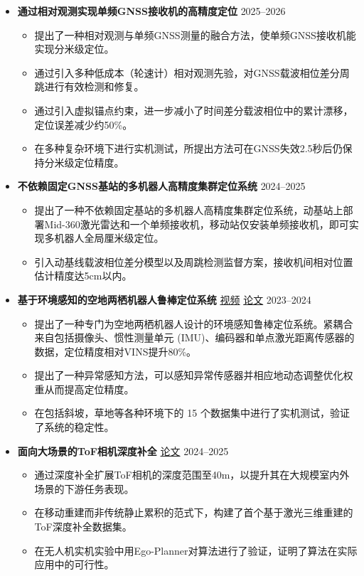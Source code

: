 \documentclass{resume}
\begin{document}
\begin{itemize}
	\item {\textbf{通过相对观测实现单频GNSS接收机的高精度定位}} \hfill {2025--2026}
	\begin{itemize}
		\item {提出了一种相对观测与单频GNSS测量的融合方法，使单频GNSS接收机能实现分米级定位。}
		\item {通过引入多种低成本（轮速计）相对观测先验，对GNSS载波相位差分周跳进行有效检测和修复。}
		\item {通过引入虚拟锚点约束，进一步减小了时间差分载波相位中的累计漂移，定位误差减少约50\%。}
		\item {在多种复杂环境下进行实机测试，所提出方法可在GNSS失效2.5秒后仍保持分米级定位精度。}
	\end{itemize}	
	\item {\textbf{不依赖固定GNSS基站的多机器人高精度集群定位系统}} \hfill {2024--2025}
	\begin{itemize}
		\item {提出了一种不依赖固定基站的多机器人高精度集群定位系统，动基站上部署Mid-360激光雷达和一个单频接收机，移动站仅安装单频接收机，即可实现多机器人全局厘米级定位。}
		\item {引入动基线载波相位差分模型以及周跳检测监督方案，接收机间相对位置估计精度达5cm以内。}
	\end{itemize}
	\item {\textbf{基于环境感知的空地两栖机器人鲁棒定位系统}}
	{\href{https://www.bilibili.com/video/BV1N4QnYqEUL/?share_source=copy_web&vd_source=8a04d759aa7f8bf8916bafb4dae034f6}{视频}}
	{\href{https://ieeexplore.ieee.org/document/11128310}{论文}}
	\hfill {2023--2024}
	\begin{itemize} 
		\item {提出了一种专门为空地两栖机器人设计的环境感知鲁棒定位系统。紧耦合来自包括摄像头、惯性测量单元 (IMU)、编码器和单点激光距离传感器的数据，定位精度相对VINS提升80\%。}
		\item {提出了一种异常感知方法，可以感知异常传感器并相应地动态调整优化权重从而提高定位精度。}
		\item {在包括斜坡，草地等各种环境下的 15 个数据集中进行了实机测试，验证了系统的稳定性。}
	\end{itemize}
	\item {\textbf{面向大场景的ToF相机深度补全}} 
	{\href{https://arxiv.org/abs/2603.20669}{论文}}
	\hfill {2024--2025}
	\begin{itemize}
		\item {通过深度补全扩展ToF相机的深度范围至40m，以提升其在大规模室内外场景的下游任务表现。}
		\item {在移动重建而非传统静止累积的范式下，构建了首个基于激光三维重建的ToF深度补全数据集。}
		\item {在无人机实机实验中用Ego-Planner对算法进行了验证，证明了算法在实际应用中的可行性。}
	\end{itemize}
\end{itemize}
\end{document}

